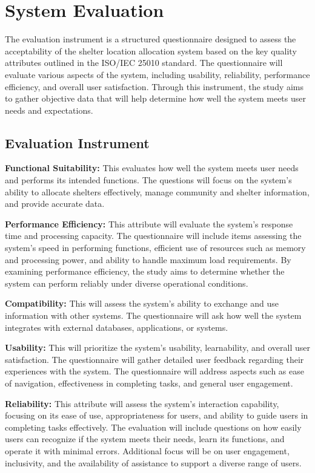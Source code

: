 \section{System Evaluation}
	The evaluation instrument is a structured questionnaire designed to assess the acceptability of the shelter location allocation system based on the key quality attributes outlined in the ISO/IEC 25010 standard. The questionnaire will evaluate various aspects of the system, including usability, reliability, performance efficiency, and overall user satisfaction. Through this instrument, the study aims to gather objective data that will help determine how well the system meets user needs and expectations.

\subsection{Evaluation Instrument}
	\textbf{Functional Suitability:} This evaluates how well the system meets user needs and performs its intended functions. The questions will focus on the system's ability to allocate shelters effectively, manage community and shelter information, and provide accurate data.
	
	\textbf{Performance Efficiency:} This attribute will evaluate the system's response time and processing capacity. The questionnaire will include items assessing the system's speed in performing functions, efficient use of resources such as memory and processing power, and ability to handle maximum load requirements. By examining performance efficiency, the study aims to determine whether the system can perform reliably under diverse operational conditions.
	
	\textbf{Compatibility:} This will assess the system’s ability to exchange and use information with other systems. The questionnaire will ask how well the system integrates with external databases, applications, or systems. 
	
	\textbf{Usability:} This will prioritize the system's usability, learnability, and overall user satisfaction. The questionnaire will gather detailed user feedback regarding their experiences with the system. The questionnaire will address aspects such as ease of navigation, effectiveness in completing tasks, and general user engagement.
	
	\textbf{Reliability:} This attribute will assess the system's interaction capability, focusing on its ease of use, appropriateness for users, and ability to guide users in completing tasks effectively. The evaluation will include questions on how easily users can recognize if the system meets their needs, learn its functions, and operate it with minimal errors. Additional focus will be on user engagement, inclusivity, and the availability of assistance to support a diverse range of users. 
	
